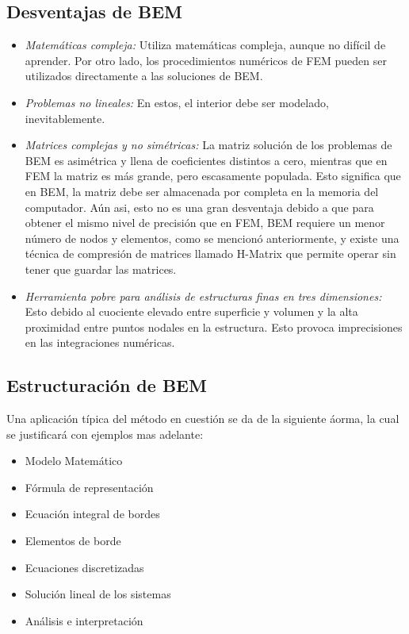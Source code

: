 \documentclass[12pt,letterpaper]{report}
\numberwithin{equation}{section}
\begin{document}
\subsection{Desventajas de BEM}
\begin{itemize}
	\item \textit{Matemáticas compleja:} Utiliza matemáticas compleja, aunque no difícil de aprender. Por otro lado, los procedimientos numéricos de FEM pueden ser utilizados directamente a las soluciones de BEM.
	\item \textit{Problemas no lineales:} En estos, el interior debe ser modelado, inevitablemente. 
	\item \textit{Matrices complejas y no simétricas:} La matriz solución de los problemas de BEM es asimétrica y llena de coeficientes distintos a cero, mientras que en FEM la matriz es más grande, pero escasamente populada. Esto significa que en BEM, la matriz debe ser almacenada por completa en la memoria del computador. Aún asi, esto no es una gran desventaja debido a que para obtener el mismo nivel de precisión que en FEM, BEM requiere un menor número de nodos y elementos, como se mencionó anteriormente, y existe una técnica de compresión de matrices llamado H-Matrix que permite operar sin tener que guardar las matrices.
	\item \textit{Herramienta pobre para análisis de estructuras finas en tres dimensiones:} Esto debido al cuociente elevado entre superficie y volumen y la alta proximidad entre puntos nodales en la estructura. Esto provoca imprecisiones en las integraciones numéricas.
\end{itemize}

\subsection{Estructuración de BEM}
Una aplicación típica del método en cuestión se da de la siguiente áorma, la cual se justificará con ejemplos mas adelante:

\begin{itemize}
	\item Modelo Matemático
	\item Fórmula de representación
	\item Ecuación integral de bordes
	\item Elementos de borde
	\item Ecuaciones discretizadas
	\item Solución lineal de los sistemas
	\item Análisis e interpretación
\end{itemize}
\end{document}
